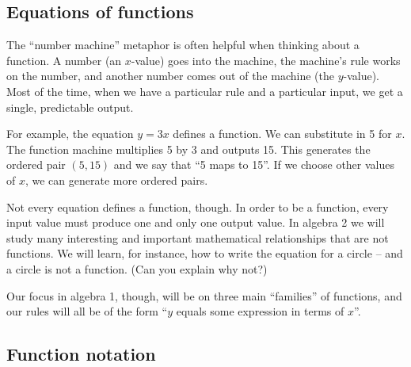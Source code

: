 

\subsection{Equations of functions}

The ``number machine'' metaphor is often helpful when thinking about a function. A number (an $x$-value) goes into the machine, the machine's rule works on the number, and another number comes out of the machine (the $y$-value). Most of the time, when we have a particular rule and a particular input, we get a single, predictable output.

For example, the equation $y = 3x$ defines a function. We can substitute in 5 for $x$. The function machine multiplies 5 by 3 and outputs 15. This generates the ordered pair $(5, 15)$ and we say that ``5 maps to 15''. If we choose other values of $x$, we can generate more ordered pairs.

Not every equation defines a function, though. In order to be a function, every input value must produce one and only one output value. In algebra 2 we will study many interesting and important mathematical relationships that are not functions. We will learn, for instance, how to write the equation for a circle -- and a circle is not a function. (Can you explain why not?)

Our focus in algebra 1, though, will be on three main ``families'' of functions, and our rules will all be of the form ``$y$ equals some expression in terms of $x$''.


\subsection{Function notation}

%

